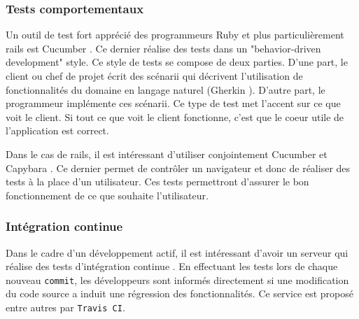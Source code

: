 \subsubsection{Tests comportementaux}
\label{cucumber}
Un outil de test fort apprécié des programmeurs Ruby et plus particulièrement \gls{rails} est Cucumber \cite{cucumber}. Ce dernier réalise des tests dans un "behavior-driven development" \cite{wiki-bdd} style. Ce style de tests se compose de deux parties. D'une part, le client ou chef de projet écrit des scénarii qui décrivent l'utilisation de fonctionnalités du domaine en langage naturel (Gherkin \cite{gherkin}). D'autre part, le programmeur implémente ces scénarii. Ce type de test met l'accent sur ce que voit le client. Si tout ce que voit le client fonctionne, c'est que le coeur utile de l'application est correct.

Dans le cas de \gls{rails}, il est intéressant d'utiliser conjointement Cucumber et Capybara \cite{capybara}. Ce dernier permet de contrôler un navigateur et donc de réaliser des tests à la place d'un utilisateur. Ces tests permettront d'assurer le bon fonctionnement de ce que souhaite l'utilisateur.

\subsubsection{Intégration continue}
\label{travis}
Dans le cadre d'un développement actif, il est intéressant d'avoir un serveur qui réalise des tests d'intégration continue \cite{wiki-int-cont}. En effectuant les tests lors de chaque nouveau \texttt{commit}, les développeurs sont informés directement si une modification du code source a induit une régression des fonctionnalités. Ce service est proposé entre autres par \texttt{Travis CI}\cite{travis}.
